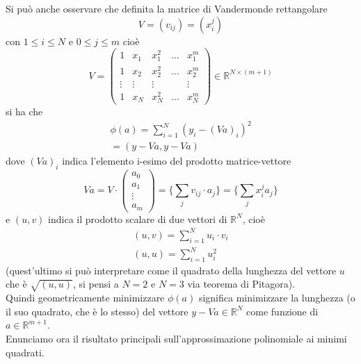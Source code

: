 \documentclass[12pt,a4paper]{article}
\begin{document}
Si può anche osservare che definita la matrice di Vandermonde rettangolare
\[
V = (v_{ij}) = (x_i^j)
\]
con $1 \leq i \leq N$ e $0 \leq j \leq m$ cioè\\
\[
V = 
\begin{pmatrix}
1 & x_1 & x_1^2 & \dotso & x_1^m \\
1 & x_2 & x_2^2 & \dotso & x_2^m \\
\vdots & \vdots & \vdots & & \vdots \\
1 & x_N & x_N^2 & \dotso & x_N^m
\end{pmatrix}
\in \mathbb{R}^{N \times (m+1)}
\]
si ha che
\[
\begin{split}
    \phi (a) = \sum_{i=1}^N (y_i - (Va)_i)^2\\
    = (y - Va, y - Va)
\end{split}
\]
dove $(Va)_i$ indica l'elemento i-esimo
del prodotto matrice-vettore
\[
Va = V \cdot 
\begin{pmatrix}
a_0 \\ a_1 \\ \vdots \\ a_m
\end{pmatrix}
= \{ \sum_j v_{ij} \cdot a_j \} = \{ \sum_j x_i^j a_j \}
\]
e $(u,v)$ indica il prodotto scalare di due vettori di $\mathbb{R}^N$, cioè 
\[
\begin{split}
(u,v) = \sum\limits_{i=1}^N u_i \cdot v_i \\
(u,u) = \sum\limits_{i=1}^N u_i^2
\end{split}
\]
(quest'ultimo si può interpretare come il quadrato della lunghezza del vettore $u$ che è $\sqrt{(u,u)}$, si pensi a $N=2$ e $N=3$ via teorema di Pitagora).\\
Quindi geometricamente minimizzare $\phi(a)$ significa minimizzare la
lunghezza (o il suo quadrato, che è lo stesso) del vettore $y - Va \in \mathbb{R}^N$ come funzione di $a \in \mathbb{R}^{m+1}$.\\
Enunciamo ora il risultato principali sull'approssimazione polinomiale ai minimi quadrati.
\end{document}
